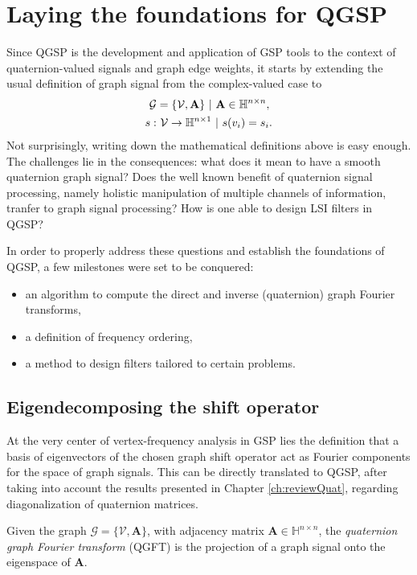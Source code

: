 
\section{Laying the foundations for QGSP}

Since QGSP is the development and application of GSP tools to the context of quaternion-valued signals and graph edge weights, it starts by extending the usual definition of graph signal from the complex-valued case to
\begin{align}\label{eq:qgsp_defs}
\mathcal{G} &= \{\mathcal{V}, \mathbf{A}\}  \ | \ \mathbf{A} \in \mathbb{H}^{n \times n}, \notag \\
s: &\ \mathcal{V} \rightarrow \mathbb{H}^{n \times 1} \ | \ s(v_i) = s_i.
\end{align}
Not surprisingly, writing down the mathematical definitions above is easy enough. The challenges lie in the consequences: what does it mean to have a smooth quaternion graph signal? Does the well known benefit of quaternion signal processing, namely holistic manipulation of multiple channels of information, tranfer to graph signal processing? How is one able to design LSI filters in QGSP?

In order to properly address these questions and establish the foundations of QGSP, a few milestones were set to be conquered:
\begin{itemize}[noitemsep]
\item an algorithm to compute the direct and inverse (quaternion) graph Fourier transforms,
\item a definition of frequency ordering,
\item a method to design filters tailored to certain problems.
\end{itemize}

\subsection{Eigendecomposing the shift operator}
At the very center of vertex-frequency analysis in GSP lies the definition that a basis of eigenvectors of the chosen graph shift operator act as Fourier components for the space of graph signals. This can be directly translated to QGSP, after taking into account the results presented in Chapter \ref{ch:reviewQuat}, regarding diagonalization of quaternion matrices.

\begin{definition}
Given the graph $\mathcal{G} = \{\mathcal{V}, \mathbf{A}\}  $,  with adjacency matrix $ \mathbf{A} \in \mathbb{H}^{n \times n}$, the \textit{quaternion graph Fourier transform} (QGFT) is the projection of a graph signal onto the eigenspace of $\mathbf{A}$.
\end{definition}

